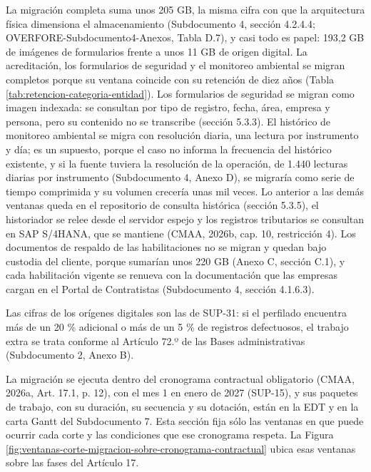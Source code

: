 \documentclass[subdoc]{../../comun/overfore}
\begin{document}
La migración completa suma unos 205 GB, la misma cifra con que la arquitectura física dimensiona el almacenamiento (Subdocumento 4, sección 4.2.4.4; OVERFORE-Subdocumento4-Anexos, Tabla D.7), y casi todo es papel: 193,2 GB de imágenes de formularios frente a unos 11 GB de origen digital. La acreditación, los formularios de seguridad y el monitoreo ambiental se migran completos porque su ventana coincide con su retención de diez años (Tabla \ref{tab:retencion-categoria-entidad}). Los formularios de seguridad se migran como imagen indexada: se consultan por tipo de registro, fecha, área, empresa y persona, pero su contenido no se transcribe (sección 5.3.3). El histórico de monitoreo ambiental se migra con resolución diaria, una lectura por instrumento y día; es un supuesto, porque el caso no informa la frecuencia del histórico existente, y si la fuente tuviera la resolución de la operación, de 1.440 lecturas diarias por instrumento (Subdocumento 4, Anexo D), se migraría como serie de tiempo comprimida y su volumen crecería unas mil veces. Lo anterior a las demás ventanas queda en el repositorio de consulta histórica (sección 5.3.5), el historiador se relee desde el servidor espejo y los registros tributarios se consultan en SAP S/4HANA, que se mantiene (CMAA, 2026b, cap. 10, restricción 4). Los documentos de respaldo de las habilitaciones no se migran y quedan bajo custodia del cliente, porque sumarían unos 220 GB (Anexo C, sección C.1), y cada habilitación vigente se renueva con la documentación que las empresas cargan en el Portal de Contratistas (Subdocumento 4, sección 4.1.6.3).

Las cifras de los orígenes digitales son las de SUP-31: si el perfilado encuentra más de un 20 \% adicional o más de un 5 \% de registros defectuosos, el trabajo extra se trata conforme al Artículo 72.º de las Bases administrativas (Subdocumento 2, Anexo B).

La migración se ejecuta dentro del cronograma contractual obligatorio (CMAA, 2026a, Art. 17.1, p. 12), con el mes 1 en enero de 2027 (SUP-15), y sus paquetes de trabajo, con su duración, su secuencia y su dotación, están en la EDT y en la carta Gantt del Subdocumento 7. Esta sección fija sólo las ventanas en que puede ocurrir cada corte y las condiciones que ese cronograma respeta. La Figura \ref{fig:ventanas-corte-migracion-sobre-cronograma-contractual} ubica esas ventanas sobre las fases del Artículo 17.
\end{document}
